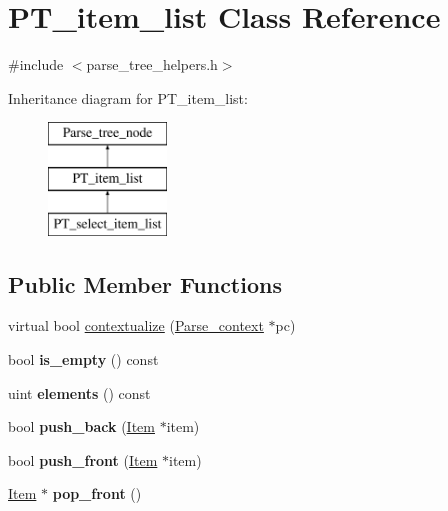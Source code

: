\hypertarget{classPT__item__list}{}\section{P\+T\+\_\+item\+\_\+list Class Reference}
\label{classPT__item__list}


{\ttfamily \#include $<$parse\+\_\+tree\+\_\+helpers.\+h$>$}

Inheritance diagram for P\+T\+\_\+item\+\_\+list\+:\begin{figure}[H]
\begin{center}
\leavevmode
\includegraphics[height=3.000000cm]{classPT__item__list}
\end{center}
\end{figure}
\subsection*{Public Member Functions}
\begin{DoxyCompactItemize}
\item 
virtual bool \mbox{\hyperlink{classPT__item__list_a5ddeca0fe325bc50ddcf4bd17da8efa8}{contextualize}} (\mbox{\hyperlink{structParse__context}{Parse\+\_\+context}} $\ast$pc)
\item 
\mbox{\label{classPT__item__list_a0379ee3cdc93f12bfa459b04d3006c99}} 
bool {\bfseries is\+\_\+empty} () const
\item 
\mbox{\label{classPT__item__list_aaef9ec87ddaa51d62a987a31cb3746b3}} 
uint {\bfseries elements} () const
\item 
\mbox{\label{classPT__item__list_a89567972ba2f2d0df413a8ba3c6f0246}} 
bool {\bfseries push\+\_\+back} (\mbox{\hyperlink{classItem}{Item}} $\ast$item)
\item 
\mbox{\label{classPT__item__list_a80c821cdfef3b30e89fa2311bdb8cbac}} 
bool {\bfseries push\+\_\+front} (\mbox{\hyperlink{classItem}{Item}} $\ast$item)
\item 
\mbox{\label{classPT__item__list_a0115c5587b92eb74151840877ca775d5}} 
\mbox{\hyperlink{classItem}{Item}} $\ast$ {\bfseries pop\+\_\+front} ()
\end{DoxyCompactItemize}

